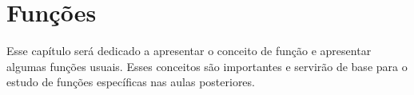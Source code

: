 \chapter{Funções}

\minitoc

Esse capítulo será dedicado a apresentar o conceito de função e apresentar
algumas funções usuais. Esses conceitos são importantes e servirão de base para
o estudo de funções específicas nas aulas posteriores.











